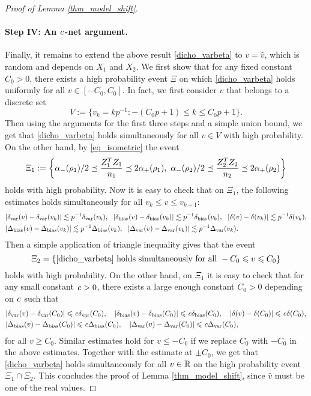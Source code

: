 \begin{proof}[Proof of Lemma \ref{thm_model_shift}]
\paragraph{Step IV: An $\e$-net argument.} Finally, it remains to extend the above result \eqref{dicho_varbeta} to $v=\hat v$, which is random and depends on $X_1$ and $X_2$. We first show that for any fixed constant $C_0>0$, there exists a high probability event $\Xi$ on which \eqref{dicho_varbeta} 
holds uniformly for all $v\in [-C_0, C_0]$. In fact, we first consider $v$ that belongs to a discrete set 
$$V:=\{v_k = kp^{-1}: -(C_0p +1)\le k \le C_0p +1\}.$$
Then using the arguments for the first three steps and a simple union bound, we get that
\eqref{dicho_varbeta} holds simultaneously for all $v\in V$ with high probability. On the other hand, by \eqref{eq_isometric} the event
$$\Xi_1:=\left\{ \al_-(\rho_1)/2 \preceq  \frac{Z_1^T Z_1}{n_1}  \preceq   2\al_+(\rho_1) ,\  \al_-(\rho_2)/2 \preceq  \frac{Z_2^T Z_2}{n_2}  \preceq   2\al_+(\rho_2)\right\}$$
holds with high probability. Now it is easy to check that on $\Xi_1$, the following estimates holds simultaneously for all $v_k \le v\le v_{k+1}$:
\begin{align*}
& |\delta_{\vari}(v) -\delta_{\vari}(v_k)|\lesssim p^{-1}\delta_{\vari}(v_k),\ \ |\delta_{\bias}(v) -\delta_{\bias}(v_k)|\lesssim p^{-1}\delta_{\bias}(v_k), \ \   |\delta(v)-\delta(v_k)|\lesssim p^{-1}\delta(v_k),\\
& |\Delta_{\bias}(v) -\Delta_{\bias}(v_k)|\lesssim p^{-1}\Delta_{\bias}(v_k),\ \ |\Delta_{\vari}(v) -\Delta_{\vari}(v_k)|\lesssim p^{-1}\Delta_{\vari}(v_k).
\end{align*}
Then a simple application of triangle inequality gives that the event 
$$\Xi_2=\{\eqref{dicho_varbeta} \text{ holds simultaneously for all }-C_0\le v \le C_0\}$$
holds with high probability. On the other hand, on $\Xi_1$ it is easy to check that for any small constant $\e>0$, there exists a large enough constant $C_0>0$ depending on $\e$ such that
\begin{align*}
& |\delta_{\vari}(v) -\delta_{\vari}(C_0)|\le \e\delta_{\vari}(C_0),\quad |\delta_{\bias}(v) -\delta_{\bias}(C_0)|\le \e\delta_{\bias}(C_0), \quad  |\delta(v)-\delta(C_0)|\le \e\delta(C_0),\\
& |\Delta_{\bias}(v) -\Delta_{\bias}(C_0)|\le \e\Delta_{\bias}(C_0),\quad |\Delta_{\vari}(v) -\Delta_{\vari}(C_0)|\le \e\Delta_{\vari}(C_0),
\end{align*}
for all $v\ge C_0$. Similar estimates hold for $v\le -C_0$ if we replace $C_0$ with $-C_0$ in the above estimates. Together with the estimate at $\pm C_0$, we get that \eqref{dicho_varbeta} holds simultaneously for all $v\in \R$ on the high probability event $\Xi_1\cap \Xi_2$. This concludes the proof of Lemma \ref{thm_model_shift}, since $\hat v$ must be one of the real values.
\end{proof}





